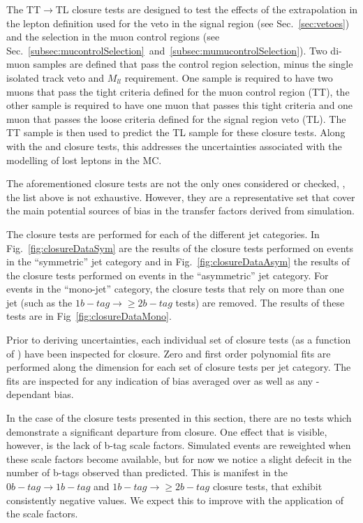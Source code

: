 The TT$\rightarrow$TL closure tests are designed to test the effects
of the extrapolation in the lepton definition used for the veto in the
signal region (see Sec.~\ref{sec:vetoes}) and the selection in the muon control
regions (see
Sec.~\ref{subsec:mucontrolSelection}~and~\ref{subsec:mumucontrolSelection}).
Two di-muon samples are defined that pass the \mmj control region
selection, minus the single isolated track veto and $M_{ll}$
requirement. One sample is required to have two muons that pass the
tight criteria defined for the muon control region (TT), the other
sample is required to have one muon that passes this tight criteria
and one muon that passes the loose criteria defined for the signal
region veto (TL). The TT sample is then used to predict the TL
sample for these closure tests. Along with the \mj \rightarrow \mmj
and \mj \rightarrow \gj closure tests, this addresses the
uncertainties associated with the modelling of lost leptons in the MC.

The aforementioned closure tests are not the only ones considered or
checked, \ie, the list above is not exhaustive. However, they are a
representative set that cover the main potential sources of bias in
the transfer factors derived from simulation. 

The closure tests are performed for each of the different jet
categories. In Fig.~\ref{fig:closureDataSym} are the results of the
closure tests performed on events in the ``symmetric'' jet category
and in Fig.~\ref{fig:closureDataAsym} the results of the closure tests
performed on events in the ``asymmetric'' jet
category. For events in the ``mono-jet'' category, the closure tests
that rely on more than one jet (such as the $1 b-tag\rightarrow\geq 2
b-tag$ tests) are removed. The results of these tests are in
Fig~\ref{fig:closureDataMono}.

Prior to deriving uncertainties, each individual set of closure tests
(as a function of \scalht) have been inspected for closure. Zero and first order
polynomial fits are performed along the \scalht dimension for each set
of closure tests per jet category. The fits are inspected for any
indication of bias averaged over \scalht as well as any
\scalht-dependant bias.

In the case of the closure tests presented in this section, there are
no tests which demonstrate a significant departure from closure. One
effect that is visible, however, is the lack of b-tag scale factors.
Simulated events are reweighted when these scale factors become
available, but for now we notice a slight defecit in the number of
b-tags observed than predicted. This is manifest in the $0 b-tag
\rightarrow 1 b-tag$ and $1 b-tag \rightarrow \geq 2 b-tag$ closure
tests, that exhibit consistently negative values. We expect this to
improve with the application of the scale factors. 

